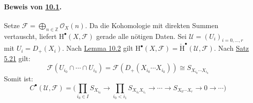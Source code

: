 \paragraph{Beweis von \hyperref[10.1]{10.1}.} Setze $\mathcal{F}=\bigoplus_{n\in\mathbb{Z}}\mathcal{O}_X(n)$. Da die Kohomologie mit direkten Summen vertauscht, liefert $\mathrm{H}^\bullet(X,\mathcal{F})$ gerade alle nötigen Daten. Sei $\mathcal{U}=(U_i)_{i=0,\ldots,r}$ mit $U_i=D_+(X_i)$. Nach \hyperref[10.2]{Lemma 10.2} gilt $\mathrm{H}^\bullet(X,\mathcal{F})=\check{\mathrm{H}}^\bullet(\mathcal{U},\mathcal{F})$. Nach \hyperref[5.21]{Satz 5.21} gilt:
\[\mathcal{F}(U_{i_0}\cap\cdots\cap U_{i_k}) = \mathcal{F}(D_+(X_{i_0}\cdots X_{i_k})) \cong S_{X_{i_0}\cdots X_{i_k}} \]
Somit ist:
\[C^\bullet(\mathcal{U},\mathcal{F}) = \Big(\prod_{i_0\in I} S_{X_{i_0}}\to \prod_{i_0<i_1} S_{X_{i_0}X_{i_1}}\to\cdots\to S_{X_0\cdots X_r} \to 0\to\cdots\Big) \]
